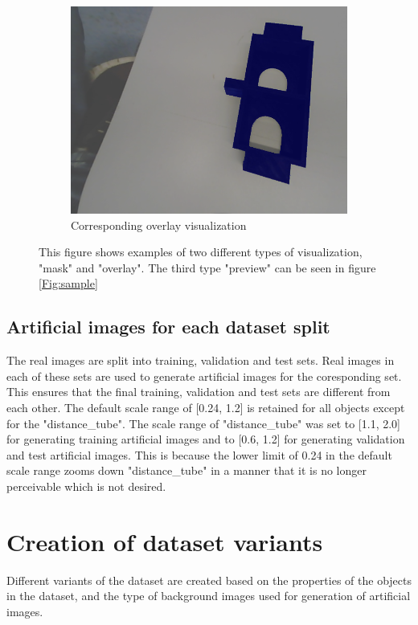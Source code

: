 \begin{itemize}
\begin{figure}
\begin{subfigure}{.3\textwidth}
  				\includegraphics[width=.9\linewidth]{images/eg_overlay}
  				\caption{Corresponding overlay visualization}
  				\label{Fig:visualsc}
			\end{subfigure}%
		\caption{This figure shows examples of two different types of visualization, "mask" and "overlay". The third type "preview" can be seen in figure \ref{Fig:sample}}
		\label{Fig:visuals}
		\end{figure}
		
	\end{itemize}
	
\subsection{Artificial images for each dataset split}

The real images are split into training, validation and test sets. Real images in each of these sets are used to generate artificial images for the coresponding set. This ensures that the final training, validation and test sets are different from each other. The default scale range of [0.24, 1.2] is retained for all objects except for the "distance\_tube". The scale range of "distance\_tube" was set to [1.1, 2.0] for generating training artificial images and to [0.6, 1.2] for generating validation and test artificial images. This is because the lower limit of 0.24 in the default scale range zooms down "distance\_tube" in a manner that it is no longer perceivable which is not desired.

\section{Creation of dataset variants}
Different variants of the dataset are created based on the properties of the objects in the dataset, and the type of  background images used for generation of artificial images.
